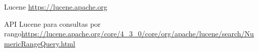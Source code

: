 % 

\begin{thebibliography}{99}

	\emph{} Lucene \url{https://lucene.apache.org}

	\emph{} API Lucene para consultas por rango\url{https://lucene.apache.org/core/4_3_0/core/org/apache/lucene/search/NumericRangeQuery.html}
	
\end{thebibliography}
